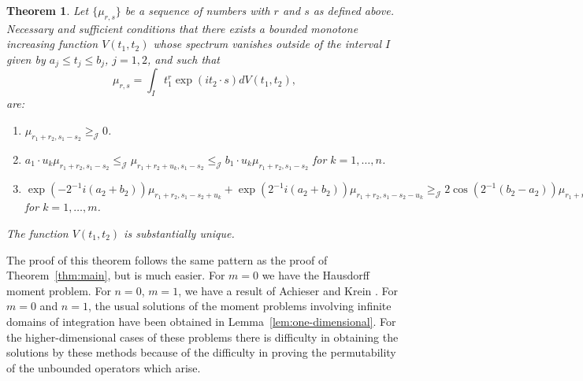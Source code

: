 \documentclass{article}
\newtheorem{theorem}{Theorem}
\begin{document}
\begin{theorem}
\label{thm:moment-problems}
Let $\{\mu_{r,s}\}$ be a sequence of numbers with $r$ and $s$ as defined above. Necessary and sufficient conditions that there exists a bounded monotone increasing function $V(t_1, t_2)$ whose spectrum vanishes outside of the interval $I$ given by $a_j \leq t_j \leq b_j$, $j = 1, 2$, and such that
\begin{equation}
\mu_{r,s} = \int_I t_1^r \exp(i t_2 \cdot s) dV(t_1, t_2),
\label{eq:moment-integral}
\end{equation}
are:
\begin{enumerate}
\item $\mu_{r_1+r_2, s_1-s_2} \geq_{\mathcal{J}} 0$.
\item $a_1 \cdot u_k \mu_{r_1+r_2, s_1-s_2} \leq_{\mathcal{J}} \mu_{r_1+r_2+u_k, s_1-s_2} \leq_{\mathcal{J}} b_1 \cdot u_k \mu_{r_1+r_2, s_1-s_2}$ for $k = 1, \ldots, n$.
\item $\exp(-2^{-1} i (a_2 + b_2)) \mu_{r_1+r_2, s_1-s_2+u_k} + \exp(2^{-1} i (a_2 + b_2)) \mu_{r_1+r_2, s_1-s_2-u_k} \geq_{\mathcal{J}} 2 \cos(2^{-1} (b_2 - a_2)) \mu_{r_1+r_2, s_1-s_2}$ for $k = 1, \ldots, m$.
\end{enumerate}

The function $V(t_1, t_2)$ is substantially unique.
\end{theorem}

The proof of this theorem follows the same pattern as the proof of Theorem~\ref{thm:main}, but is much easier. For $m = 0$ we have the Hausdorff moment problem. For $n = 0$, $m = 1$, we have a result of Achieser and Krein \cite{achieser-krein}. For $m = 0$ and $n = 1$, the usual solutions of the moment problems involving infinite domains of integration have been obtained in Lemma~\ref{lem:one-dimensional}. For the higher-dimensional cases of these problems there is difficulty in obtaining the solutions by these methods because of the difficulty in proving the permutability of the unbounded operators which arise.
\end{document}
